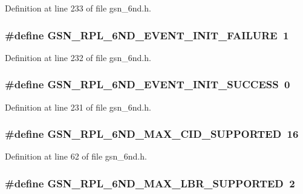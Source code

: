 Definition at line 233 of file gsn\_\-6nd.h.

\hypertarget{a00473_acef4350a88a60e81e1d9daa023ba7708}{
\subsubsection[{GSN\_\-RPL\_\-6ND\_\-EVENT\_\-INIT\_\-FAILURE}]{\setlength{\rightskip}{0pt plus 5cm}\#define GSN\_\-RPL\_\-6ND\_\-EVENT\_\-INIT\_\-FAILURE~1}}
\label{a00473_acef4350a88a60e81e1d9daa023ba7708}


Definition at line 232 of file gsn\_\-6nd.h.

\hypertarget{a00473_a80cfdd07b9d7835c66228c0c5b1a6293}{
\subsubsection[{GSN\_\-RPL\_\-6ND\_\-EVENT\_\-INIT\_\-SUCCESS}]{\setlength{\rightskip}{0pt plus 5cm}\#define GSN\_\-RPL\_\-6ND\_\-EVENT\_\-INIT\_\-SUCCESS~0}}
\label{a00473_a80cfdd07b9d7835c66228c0c5b1a6293}


Definition at line 231 of file gsn\_\-6nd.h.

\hypertarget{a00473_ad10ba50282fc0393644e37c0a600d6a0}{
\subsubsection[{GSN\_\-RPL\_\-6ND\_\-MAX\_\-CID\_\-SUPPORTED}]{\setlength{\rightskip}{0pt plus 5cm}\#define GSN\_\-RPL\_\-6ND\_\-MAX\_\-CID\_\-SUPPORTED~16}}
\label{a00473_ad10ba50282fc0393644e37c0a600d6a0}


Definition at line 62 of file gsn\_\-6nd.h.

\hypertarget{a00473_a4b606925279bd0c5fc08e2bcd58c4cb5}{
\subsubsection[{GSN\_\-RPL\_\-6ND\_\-MAX\_\-LBR\_\-SUPPORTED}]{\setlength{\rightskip}{0pt plus 5cm}\#define GSN\_\-RPL\_\-6ND\_\-MAX\_\-LBR\_\-SUPPORTED~2}}
\label{a00473_a4b606925279bd0c5fc08e2bcd58c4cb5}


